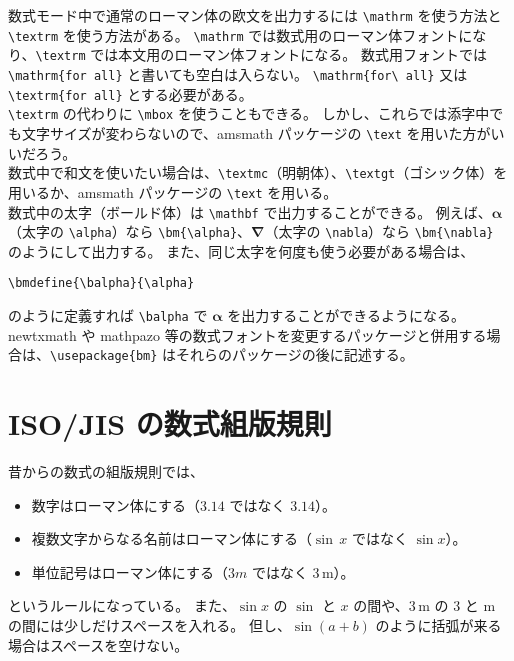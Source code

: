 数式モード中で通常のローマン体の欧文を出力するには \verb`\mathrm` を使う方法と \verb`\textrm` を使う方法がある。
\verb`\mathrm` では数式用のローマン体フォントになり、\verb`\textrm` では本文用のローマン体フォントになる。
数式用フォントでは \verb`\mathrm{for all}` と書いても空白は入らない。
\verb`\mathrm{for\ all}` 又は \verb`\textrm{for all}` とする必要がある。\\

\verb`\textrm` の代わりに \verb`\mbox` を使うこともできる。
しかし、これらでは添字中でも文字サイズが変わらないので、amsmath パッケージの \verb`\text` を用いた方がいいだろう。\\

数式中で和文を使いたい場合は、\verb`\textmc`（明朝体）、\verb`\textgt`（ゴシック体）を用いるか、amsmath パッケージの \verb`\text` を用いる。\\

数式中の太字（ボールド体）は \verb`\mathbf` で出力することができる。
例えば、$\bm{\alpha}$（太字の \verb`\alpha`）なら \verb`\bm{\alpha}`、$\bm{\nabla}$（太字の \verb`\nabla`）なら \verb`\bm{\nabla}` のようにして出力する。
また、同じ太字を何度も使う必要がある場合は、
\begin{mdframed}[roundcorner=0.50zw,leftmargin=3.00zw,rightmargin=3.00zw,skipabove=0.40zw,skipbelow=0.40zw,innertopmargin=4.00pt,innerbottommargin=4.00pt,innerleftmargin=5.00pt,innerrightmargin=5.00pt,linecolor=gray!020,linewidth=0.50pt,backgroundcolor=gray!20]
\begin{verbatim}
\bmdefine{\balpha}{\alpha}
\end{verbatim}
\end{mdframed}
のように定義すれば \verb`\balpha` で $\bm{\alpha}$ を出力することができるようになる。\\

newtxmath や mathpazo 等の数式フォントを変更するパッケージと併用する場合は、\verb`\usepackage{bm}` はそれらのパッケージの後に記述する。
\section{ISO/JIS の数式組版規則}
昔からの数式の組版規則では、
\begin{itemize}\setlength{\leftskip}{-1.00zw}%
\item 数字はローマン体にする（$\mathit{3.14}$ ではなく $\mathrm{3.14}$）。
\item 複数文字からなる名前はローマン体にする（$\sin\,x$ ではなく $\sin{x}$）。
\item 単位記号はローマン体にする（$3\mathit{m}$ ではなく $3\,\mathrm{m}$）。
\end{itemize}
というルールになっている。
また、$\sin{x}$ の $\sin$ と $x$ の間や、$3\,\mathrm{m}$ の $3$ と $\mathrm{m}$ の間には少しだけスペースを入れる。
但し、$\sin{(a+b)}$ のように括弧が来る場合はスペースを空けない。\\

